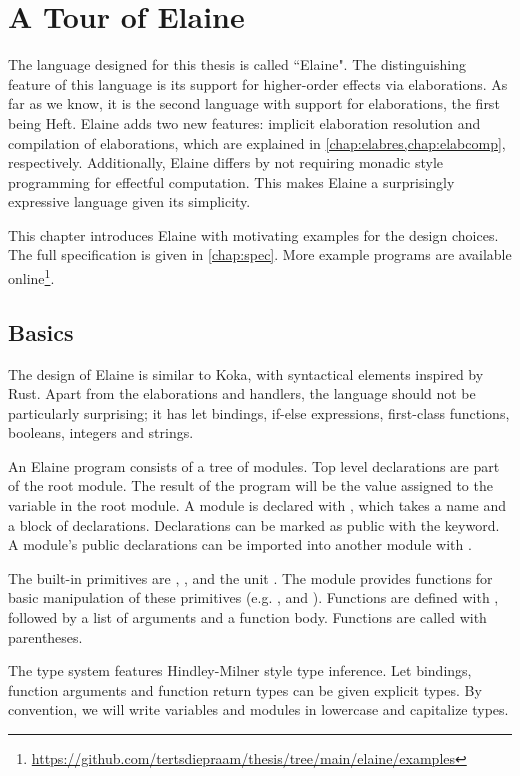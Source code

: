 \chapter{A Tour of Elaine}\label{chap:basics}

The language designed for this thesis is called ``Elaine". The distinguishing feature of this language is its support for higher-order effects via elaborations. As far as we know, it is the second language with support for elaborations, the first being Heft. Elaine adds two new features: implicit elaboration resolution and compilation of elaborations, which are explained in \cref{chap:elabres,chap:elabcomp}, respectively. Additionally, Elaine differs by not requiring monadic style programming for effectful computation. This makes Elaine a surprisingly expressive language given its simplicity.

This chapter introduces Elaine with motivating examples for the design choices. The full specification is given in \cref{chap:spec}. More example programs are available online\footnote{\url{https://github.com/tertsdiepraam/thesis/tree/main/elaine/examples}}.

\section{Basics}

The design of Elaine is similar to Koka, with syntactical elements inspired by Rust. Apart from the elaborations and handlers, the language should not be particularly surprising; it has let bindings, if-else expressions, first-class functions, booleans, integers and strings.

An Elaine program consists of a tree of modules. Top level declarations are part of the root module. The result of the program will be the value assigned to the  variable in the root module. A module is declared with , which takes a name and a block of declarations. Declarations can be marked as public with the  keyword. A module's public declarations can be imported into another module with .

The built-in primitives are , ,  and the unit \el{()}. The  module provides functions for basic manipulation of these primitives (e.g. ,  and ). Functions are defined with , followed by a list of arguments and a function body. Functions are called with parentheses.

The type system features Hindley-Milner style type inference. Let bindings, function arguments and function return types can be given explicit types. By convention, we will write variables and modules in lowercase and capitalize types.

